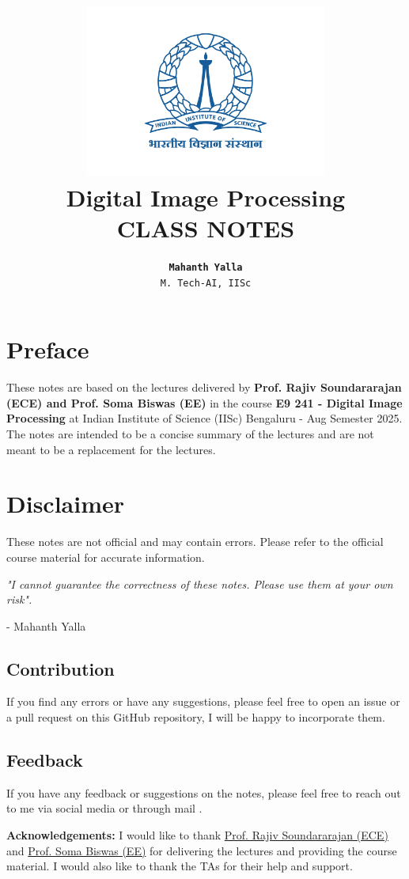 \documentclass{report}
\title{
    \vspace{-2cm} %
    \includegraphics[width=8cm]{iisc-logo.png}\\ %
    \vspace{1cm} %
    {\huge \textbf{Digital Image Processing}}\\
    \vspace{0.5cm} %
    \textsf{\large CLASS NOTES}
}
\author{\LARGE{\textbf{\texttt{Mahanth Yalla}}}\\ \texttt{\large M. Tech-AI, IISc}}
\date{}
\begin{document}
\begin{titlepage}
    \centering
    \maketitle
\end{titlepage}

\newpage
{}

\section*{Preface}
These notes are based on the lectures delivered by {\bf Prof. Rajiv Soundararajan (ECE) and Prof. Soma Biswas (EE)} in the course {\bf E9 241 - Digital Image Processing} 
at Indian Institute of Science (IISc) Bengaluru - Aug Semester 2025. 
The notes are intended to be a concise summary of the lectures and are not meant to be a replacement for the lectures. 

\section*{Disclaimer}
These notes are not official and may contain errors. Please refer to the official course material for accurate information.

\textit{"I cannot guarantee the correctness of these notes. Please use them at your own risk".}

\hfill- Mahanth Yalla 

\subsection*{Contribution}
If you find any errors or have any suggestions, please feel free to open an issue or a pull request on this GitHub repository, I will be happy to incorporate them.
\subsection*{Feedback}
If you have any feedback or suggestions on the notes, please feel free to reach out to me via social media or through mail  .

\vfill
{\bf Acknowledgements:} I would like to thank \href{https://ece.iisc.ac.in/~rajivs/#/}{Prof. Rajiv Soundararajan (ECE)} and \href{https://ee.iisc.ac.in/soma-biswas/}{Prof. Soma Biswas (EE)} for delivering the lectures and providing the course material. 
I would also like to thank the TAs for their help and support. 

\tableofcontents
\pagebreak


% 
% 
% 




\end{document}
